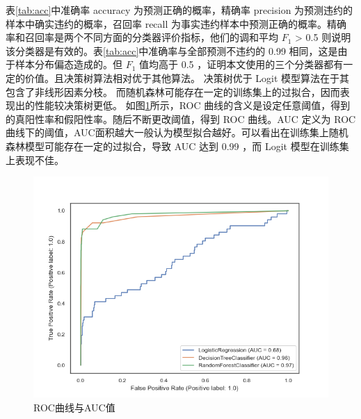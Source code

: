 表\ref{tab:acc}中准确率 accuracy 为预测正确的概率，精确率 precision 为预测违约的样本中确实违约的概率，召回率 recall 为事实违约样本中预测正确的概率。精确率和召回率是两个不同方面的分类器评价指标，他们的调和平均 \(F_1\) > 0.5 则说明该分类器是有效的。表\ref{tab:acc}中准确率与全部预测不违约的 0.99 相同，这是由于样本分布偏态造成的。但 \(F_1\) 值均高于 0.5 ，证明本文使用的三个分类器都有一定的价值。且决策树算法相对优于其他算法。
决策树优于 Logit 模型算法在于其包含了非线形因素分枝。
而随机森林可能存在一定的训练集上的过拟合，因而表现出的性能较决策树更低。
如图\ref{fig:roc}所示，ROC 曲线的含义是设定任意阈值，得到的真阳性率和假阳性率。随后不断更改阈值，得到 ROC 曲线。AUC 定义为 ROC 曲线下的阈值，AUC面积越大一般认为模型拟合越好。可以看出在训练集上随机森林模型可能存在一定的过拟合，导致 AUC 达到 0.99 ，而 Logit 模型在训练集上表现不佳。
\begin{figure}[ht]
	\centering
	\includegraphics[width=.9\linewidth]{./data/roc.png}
	\caption{\label{fig:roc}ROC曲线与AUC值}
\end{figure}
